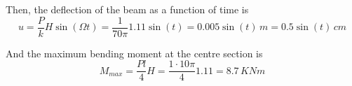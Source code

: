 \begin{Answer}[ref={moving_load}]
Then, the deflection of the beam as a function of time is
$$
u = \frac{P}{k}H\sin(\Omega t) = \frac{1}{70\pi}1.11\sin(t) = 0.005\sin(t)\,m = 0.5\sin(t)\,cm
$$

And the maximum bending moment at the centre section is
$$
M_{max} = \frac{Pl}{4}H = \frac{1 \cdot 10\pi}{4}1.11 = 8.7\,KNm
$$
\end{Answer}
